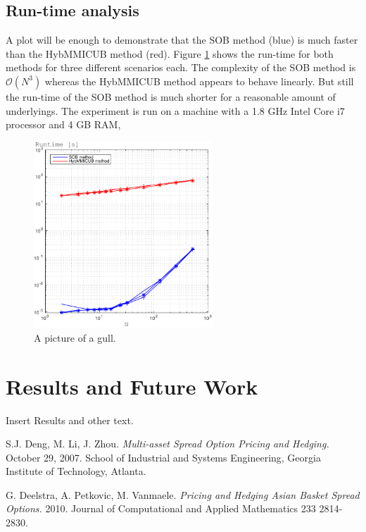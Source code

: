 \documentclass[a4paper]{article}
\begin{document}
\subsection{Run-time analysis}
\label{rt}
A plot will be enough to demonstrate that the SOB method (blue) is much faster than the HybMMICUB method (red). Figure \ref{fig:rt} shows the run-time for both methods for three different scenarios each. The complexity of the SOB method is $\mathcal{O}(N^3)$ whereas the HybMMICUB method appears to behave linearly. But still the run-time of the SOB method is much shorter for a reasonable amount of underlyings. The experiment is run on a machine with a 1.8 GHz Intel Core i7 processor and 4 GB RAM,
\begin{figure}[h!]
	\centering
	\includegraphics[width=0.6\textwidth]{graphics/runtime.pdf}
	\caption{A picture of a gull.}
	\label{fig:rt}
\end{figure}
\newpage
\section{Results and Future Work}
\label{sec:results}
Insert Results and other text.

\newpage
\begin{thebibliography}{1}
S.J. Deng, M. Li, J. Zhou.
\textit{Multi-asset Spread Option Pricing and Hedging.}
October 29, 2007. School of Industrial and Systems Engineering, Georgia Institute of Technology, Atlanta.

G. Deelstra, A. Petkovic, M. Vanmaele.
\textit{Pricing and Hedging Asian Basket Spread Options.}
2010. Journal of Computational and Applied Mathematics 233 2814-2830.

\end{thebibliography}
\end{document}
